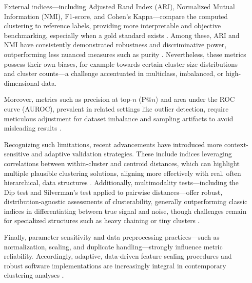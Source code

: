 \documentclass[11pt]{article}
\begin{document}
External indices—including Adjusted Rand Index (ARI), Normalized Mutual Information (NMI), F1-score, and Cohen’s Kappa—compare the computed clustering to reference labels, providing more interpretable and objective benchmarking, especially when a gold standard exists \cite{ref14,ref16,ref17,ref21,ref22,ref44,ref45,ref46,ref50,ref67,ref72,ref75,ref77,ref78,ref90,ref93,ref94,ref95,ref96,ref97,ref100,ref113}. Among these, ARI and NMI have consistently demonstrated robustness and discriminative power, outperforming less nuanced measures such as purity \cite{ref17,ref44}. Nevertheless, these metrics possess their own biases, for example towards certain cluster size distributions and cluster counts—a challenge accentuated in multiclass, imbalanced, or high-dimensional data.

Moreover, metrics such as precision at top-$n$ (P@$n$) and area under the ROC curve (AUROC), prevalent in related settings like outlier detection, require meticulous adjustment for dataset imbalance and sampling artifacts to avoid misleading results \cite{ref14}.

Recognizing such limitations, recent advancements have introduced more context-sensitive and adaptive validation strategies. These include indices leveraging correlations between within-cluster and centroid distances, which can highlight multiple plausible clustering solutions, aligning more effectively with real, often hierarchical, data structures \cite{ref17}. Additionally, multimodality tests—including the Dip test and Silverman’s test applied to pairwise distances—offer robust, distribution-agnostic assessments of clusterability, generally outperforming classic indices in differentiating between true signal and noise, though challenges remain for specialized structures such as heavy chaining or tiny clusters \cite{ref94,ref95}.

Finally, parameter sensitivity and data preprocessing practices—such as normalization, scaling, and duplicate handling—strongly influence metric reliability. Accordingly, adaptive, data-driven feature scaling procedures and robust software implementations are increasingly integral in contemporary clustering analyses \cite{ref95,ref96}.
\end{document}
